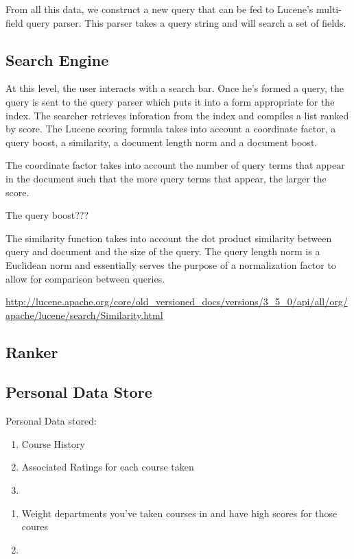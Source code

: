 \documentclass[12pt,letterpaper]{article}
\begin{document}
From all this data, we construct a new query that can be fed to Lucene's multi-field query parser. This parser takes a query string and will search a set of fields.
	
\subsection{Search Engine}
At this level, the user interacts with a search bar. Once he's formed a query, the query is sent to the query parser which puts it into a form appropriate for the index. The searcher retrieves inforation from the index and compiles a list ranked by score. The Lucene scoring formula takes into account a coordinate factor, a query boost, a similarity, a document length norm and a document boost. 

The coordinate factor takes into account the number of query terms that appear in the document such that the more query terms that appear, the larger the score. 

The query boost???

The similarity function takes into account the dot product similarity between query and document and the size of the query. The query length norm is a Euclidean norm and essentially serves the purpose of a normalization factor to allow for comparison between queries.
				
\url{http://lucene.apache.org/core/old_versioned_docs/versions/3_5_0/api/all/org/apache/lucene/search/Similarity.html}
		
\subsection{Ranker}
\subsection{Personal Data Store}
Personal Data stored:
\begin{enumerate}
\item Course History
\item Associated Ratings for each course taken
\item 
\end{enumerate}

\begin{enumerate}
\item Weight departments you've taken courses in and have high scores for those coures
\item 
\end{enumerate}
\end{document}
